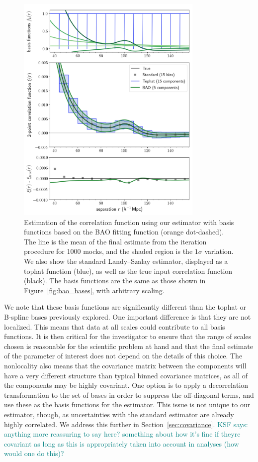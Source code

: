 \documentclass[modern]{aastex62}
\newcommand{\KSF}[1]{\textcolor{teal}{KSF says: #1}}
\begin{document}
\label{fig:bao}
\begin{figure}[th]
\centering
    \includegraphics[width=0.8\textwidth]{xicomparison_2e-4_tophat8_baoiter}
    \caption{Estimation of the correlation function using our estimator with basis functions based on the BAO fitting function (orange dot-dashed). The line is the mean of the final estimate from the iteration procedure for 1000 mocks, and the shaded region is the $1\sigma$ variation. We also show the standard Landy--Szalay estimator, displayed as a tophat function (blue), as well as the true input correlation function (black). The basis functions are the same as those shown in Figure~\ref{fig:bao_bases}, with arbitrary scaling.}
\end{figure}

We note that these basis functions are significantly different than the tophat or B-spline bases previously explored.
One important difference is that they are not localized.
This means that data at all scales could contribute to all basis functions.
It is then critical for the investigator to ensure that the range of scales chosen is reasonable for the scientific problem at hand and that the final estimate of the parameter of interest does not depend on the details of this choice.
The nonlocality also means that the covariance matrix between the components will have a very different structure than typical binned covariance matrices, as all of the components may be highly covariant.
One option is to apply a decorrelation transformation to the set of bases in order to suppress the off-diagonal terms, and use these as the basis functions for the estimator.
This issue is not unique to our estimator, though, as uncertainties with the standard estimator are already highly correlated.
We address this further in Section~\ref{sec:covariance}.
\KSF{anything more reassuring to say here? something about how it's fine if theyre covariant as long as this is appropriately taken into account in analyses (how would one do this)?}
\end{document}
